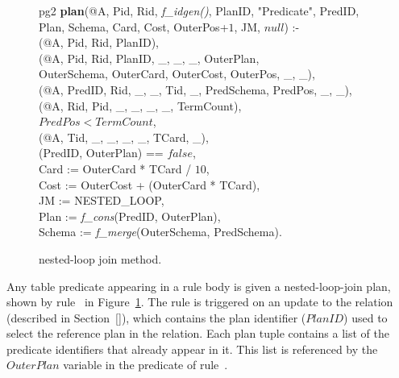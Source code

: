 \begin{figure}
\ssp
\centering
\begin{boxedminipage}{\linewidth}
\linenumbers
pg2 {\bf plan}(@A, Pid, Rid, {\em f\_idgen()}, PlanID, "Predicate", PredID, \\
\datalogspace \xspace Plan, Schema, Card, Cost, OuterPos+$1$, JM, $null$) :-\\
(@A, Pid, Rid, PlanID),\\
(@A, Pid, Rid, PlanID, \_, \_, \_, OuterPlan, \\
\datalogspace \datalogspace OuterSchema, OuterCard, OuterCost, OuterPos, \_, \_),  \\   
(@A, PredID, Rid, \_, \_, Tid, \_, PredSchema, PredPos, \_, \_),\\
(@A, Rid, Pid, \_, \_, \_, \_, TermCount), \\
\datalogspace $PredPos < TermCount$,\\
(@A, Tid, \_, \_, \_, \_, TCard, \_),\\
(PredID, OuterPlan) == $false$,\\
\datalogspace Card := OuterCard * TCard / $10$,\\
\datalogspace Cost := OuterCost + (OuterCard * TCard),\\
\datalogspace JM := NESTED\_LOOP, \\
\datalogspace Plan := {\em f\_cons}(PredID, OuterPlan), \\
\datalogspace Schema := {\em f\_merge}(OuterSchema, PredSchema).\\
\end{boxedminipage}
\caption{\label{ch:evita:fig:plangen1}nested-loop join method.}
\end{figure}

Any table predicate appearing in a rule body is given a nested-loop-join plan,
shown by rule~ in Figure~\ref{ch:evita:fig:plangen1}.  The rule is
triggered on an update to the  relation (described in
Section~\ref{}), which contains the plan identifier ($PlanID$) used to select
the reference plan in the  relation.  Each plan tuple contains a list
of the predicate identifiers that already appear in it.  This list is
referenced by the $OuterPlan$ variable in the  predicate of
rule~.


